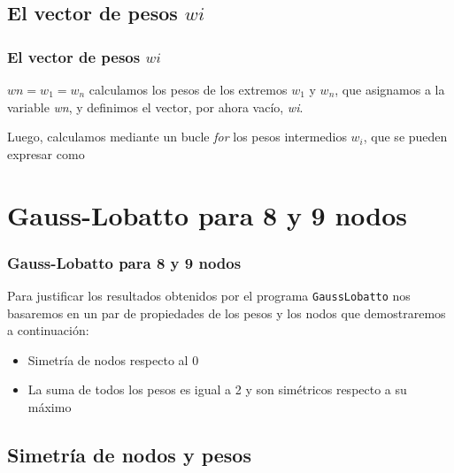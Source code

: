 \documentclass{beamer}
\begin{document}
\subsection{El vector de pesos $wi$}
\begin{frame}
\frametitle{El vector de pesos $wi$}
$wn=w_1=w_n$
calculamos los pesos de los extremos $w_1$ y $w_n$, que asignamos a la variable \textit{wn}, y definimos el vector, por ahora vacío, \textit{wi}.

Luego, calculamos mediante un bucle \textit{for} los pesos intermedios $w_i$, que se pueden expresar como
\end{frame}
\section{Gauss-Lobatto para 8 y 9 nodos}

\begin{frame}
\frametitle{Gauss-Lobatto para 8 y 9 nodos}
Para justificar los resultados obtenidos por el programa \texttt{GaussLobatto} nos basaremos en un par de propiedades de los pesos y los nodos que demostraremos a continuación:
\begin{itemize}
    \item Simetría de nodos respecto al 0
    \item La suma de todos los pesos es igual a 2 y son simétricos respecto a su máximo
\end{itemize}
\end{frame}

\subsection{Simetría de nodos y pesos}
\end{document}
